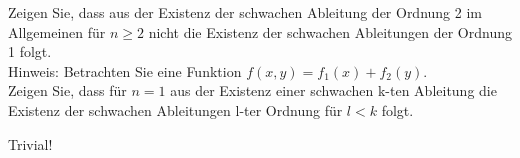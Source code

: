 \begin{exercise}

Zeigen Sie, dass aus der Existenz der schwachen Ableitung der Ordnung 2 im Allgemeinen für $n \geq 2$ nicht die Existenz der schwachen Ableitungen der Ordnung 1 folgt. \\

Hinweis: Betrachten Sie eine Funktion $f(x,y) = f_1(x) + f_2(y)$.\\
Zeigen Sie, dass für $n = 1$ aus der Existenz einer schwachen k-ten Ableitung die Existenz der schwachen Ableitungen l-ter Ordnung für $l < k$ folgt.

\end{exercise}

\begin{solution}

Trivial!

\end{solution}
